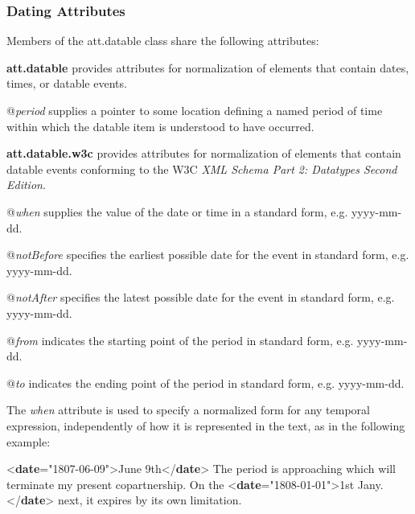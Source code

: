 \subsubsection[{Dating Attributes}]{Dating Attributes}\label{NDATTSda}\par
Members of the \textsf{att.datable} class share the following attributes: 
\begin{sansreflist}
  
\item [\textbf{att.datable}] provides attributes for normalization of elements that contain dates, times, or datable events.\hfil\\[-10pt]\begin{sansreflist}
    \item[@{\itshape period}]
  supplies a pointer to some location defining a named period of time within which the datable item is understood to have occurred.
\end{sansreflist}  
\item [\textbf{att.datable.w3c}] provides attributes for normalization of elements that contain datable events conforming to the W3C \textit{XML Schema Part 2: Datatypes Second Edition}.\hfil\\[-10pt]\begin{sansreflist}
    \item[@{\itshape when}]
  supplies the value of the date or time in a standard form, e.g. yyyy-mm-dd.
    \item[@{\itshape notBefore}]
  specifies the earliest possible date for the event in standard form, e.g. yyyy-mm-dd.
    \item[@{\itshape notAfter}]
  specifies the latest possible date for the event in standard form, e.g. yyyy-mm-dd.
    \item[@{\itshape from}]
  indicates the starting point of the period in standard form, e.g. yyyy-mm-dd.
    \item[@{\itshape to}]
  indicates the ending point of the period in standard form, e.g. yyyy-mm-dd.
\end{sansreflist}  
\end{sansreflist}
\par
The {\itshape when} attribute is used to specify a normalized form for any temporal expression, independently of how it is represented in the text, as in the following example: \par\bgroup{}\exampleFont \begin{shaded}\noindent\mbox{}{<\textbf{date}\hspace*{1em}{when}="{1807-06-09}">}June 9th{</\textbf{date}>} The period is approaching which will terminate my present\mbox{}\newline 
 copartnership. On the {<\textbf{date}\hspace*{1em}{when}="{1808-01-01}">}1st Jany.{</\textbf{date}>} next, it expires by its own limitation.\end{shaded}\egroup\par \par
